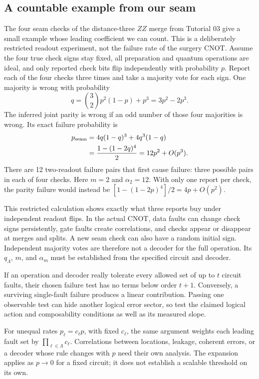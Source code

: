 \documentclass[11pt,a4paper]{article}
\begin{document}
\subsection{A countable example from our seam}
The four seam checks of the distance-three $ZZ$ merge from Tutorial 03 give a small example whose leading coefficient we can count. This is a deliberately restricted readout experiment, not the failure rate of the surgery CNOT. Assume the four true check signs stay fixed, all preparation and quantum operations are ideal, and only reported check bits flip independently with probability $p$. Report each of the four checks three times and take a majority vote for each sign. One majority is wrong with probability
\[
q=\binom32p^2(1-p)+p^3=3p^2-2p^3.
\]
The inferred joint parity is wrong if an odd number of those four majorities is wrong. Its exact failure probability is
\begin{align}
p_{\rm seam}&=4q(1-q)^3+4q^3(1-q)\notag\\
&=\frac{1-(1-2q)^4}{2}=12p^2+O(p^3).\label{eq:seamrate}
\end{align}
There are 12 two-readout failure pairs that first cause failure: three possible pairs in each of four checks. Here $m=2$ and $\alpha_2=12$. With only one report per check, the parity failure would instead be $[1-(1-2p)^4]/2=4p+O(p^2)$.

This restricted calculation shows exactly what three reports buy under independent readout flips. In the actual CNOT, data faults can change check signs persistently, gate faults create correlations, and checks appear or disappear at merges and splits. A new seam check can also have a random initial sign. Independent majority votes are therefore not a decoder for the full operation. Its $q_{\Lambda}$, $m$, and $\alpha_m$ must be established from the specified circuit and decoder.

If an operation and decoder really tolerate every allowed set of up to $t$ circuit faults, their chosen failure test has no terms below order $t+1$. Conversely, a surviving single-fault failure produces a linear contribution. Passing one observable test can hide another logical error sector, so test the claimed logical action and composability conditions as well as its measured slope.

For unequal rates $p_\ell=c_\ell p$, with fixed $c_\ell$, the same argument weights each leading fault set by $\prod_{\ell\in\Lambda}c_\ell$. Correlations between locations, leakage, coherent errors, or a decoder whose rule changes with $p$ need their own analysis. The expansion applies as $p\to0$ for a fixed circuit; it does not establish a scalable threshold on its own.
\end{document}
